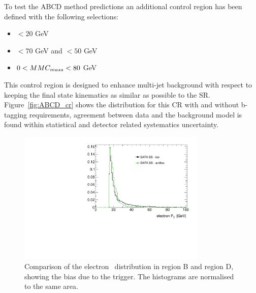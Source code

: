 To test the ABCD method predictions an additional control region has been defined with the following selections:
\begin{itemize}
\item \MET $< 20$ GeV
\item \Ht $< 70$ GeV and \SumLtMET$ < 50$ GeV
\item $0 < MMC_{mass} < 80$ GeV  	 
\end{itemize}
This control region is designed to enhance multi-jet background with respect to \Ztautau keeping the final 
state kinematics as similar as possible to the SR.
Figure~\ref{fig:ABCD_cr} shows the \mmc distribution for this CR with and without b-tagging requirements, 
agreement between data and the background model is found within statistical and detector related systematics uncertainty. 

\begin{figure}[tp]
	\begin{center}
	\includegraphics[width=9cm]{figure/ABCD_regionB_Vs_regionD}
	\end{center}
	\caption{Comparison of the electron \pt~distribution in region B and region D, showing the bias due to the trigger. 
	The histograms are normalised to the same area.}
	\label{fig:BvsD}
\end{figure}



